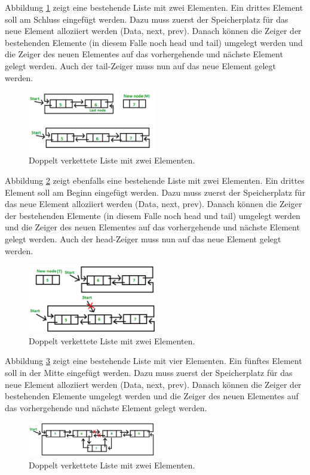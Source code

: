 Abbildung \ref{fig:Doubly_Linked_List_2_1} zeigt eine bestehende Liste mit zwei Elementen. Ein drittes Element soll am Schluss eingefügt werden. Dazu muss zuerst der Speicherplatz für das neue Element alloziiert werden (Data, next, prev). Danach können die Zeiger der bestehenden Elemente (in diesem Falle noch head und tail) umgelegt werden und die Zeiger des neuen Elementes auf das vorhergehende und nächste Element gelegt werden. Auch der tail-Zeiger muss nun auf das neue Element gelegt werden.

\begin{figure}[h!]
	\centering
	\includegraphics[width=0.5\textwidth]{graphics/Doubly_Linked_List_2_1}
	\caption{Doppelt verkettete Liste mit zwei Elementen.\cite{kumar_doubly_2017}}
	\label{fig:Doubly_Linked_List_2_1}
\end{figure}

Abbildung \ref{fig:Doubly_Linked_List_2_2} zeigt ebenfalls eine bestehende Liste mit zwei Elementen. Ein drittes Element soll am Beginn eingefügt werden. Dazu muss zuerst der Speicherplatz für das neue Element alloziiert werden (Data, next, prev). Danach können die Zeiger der bestehenden Elemente (in diesem Falle noch head und tail) umgelegt werden und die Zeiger des neuen Elementes auf das vorhergehende und nächste Element gelegt werden. Auch der head-Zeiger muss nun auf das neue Element gelegt werden.

\begin{figure}[h!]
	\centering
	\includegraphics[width=0.5\textwidth]{graphics/Doubly_Linked_List_2_2}
	\caption{Doppelt verkettete Liste mit zwei Elementen.\cite{kumar_doubly_2017}}
	\label{fig:Doubly_Linked_List_2_2}
\end{figure}


Abbildung \ref{fig:Doubly_Linked_List_2_3} zeigt eine bestehende Liste mit vier Elementen. Ein fünftes Element soll in der Mitte eingefügt werden. Dazu muss zuerst der Speicherplatz für das neue Element alloziiert werden (Data, next, prev). Danach können die Zeiger der bestehenden Elemente umgelegt werden und die Zeiger des neuen Elementes auf das vorhergehende und nächste Element gelegt werden.

\begin{figure}[h!]
	\centering
	\includegraphics[width=0.5\textwidth]{graphics/Doubly_Linked_List_2_3}
	\caption{Doppelt verkettete Liste mit zwei Elementen.\cite{kumar_doubly_2017}}
	\label{fig:Doubly_Linked_List_2_3}
\end{figure}

